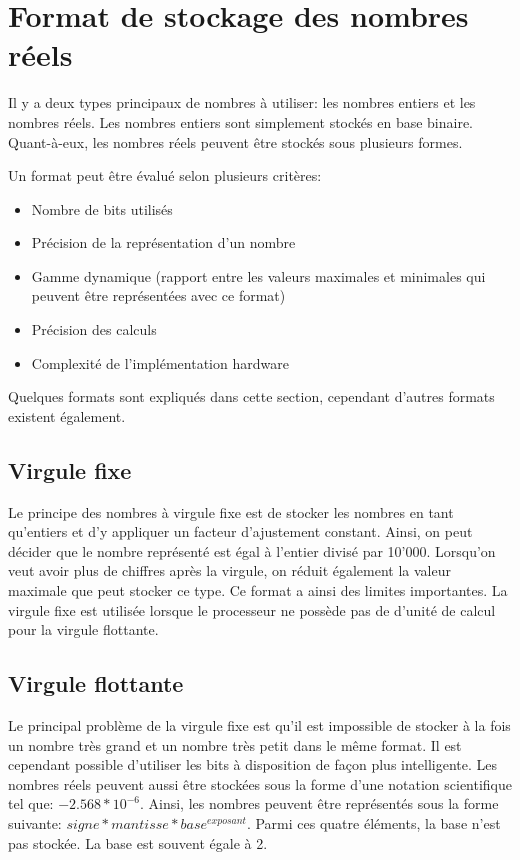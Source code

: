 \section{Format de stockage des nombres réels}

Il y a deux types principaux de nombres à utiliser: les nombres entiers et les nombres réels. Les nombres entiers sont simplement stockés en base binaire. Quant-à-eux, les nombres réels peuvent être stockés sous plusieurs formes.

Un format peut être évalué selon plusieurs critères:

\begin{itemize}
    \item Nombre de bits utilisés
    \item Précision de la représentation d'un nombre
    \item Gamme dynamique (rapport entre les valeurs maximales et minimales qui peuvent être représentées avec ce format)
    \item Précision des calculs
    \item Complexité de l'implémentation hardware
\end{itemize}

Quelques formats sont expliqués dans cette section, cependant d'autres formats existent également.

\subsection{Virgule fixe}

Le principe des nombres à virgule fixe est de stocker les nombres en tant qu'entiers et d'y appliquer un facteur d'ajustement constant. Ainsi, on peut décider que le nombre représenté est égal à l'entier divisé par 10'000. Lorsqu'on veut avoir plus de chiffres après la virgule, on réduit également la valeur maximale que peut stocker ce type. Ce format a ainsi des limites importantes. La virgule fixe est utilisée lorsque le processeur ne possède pas de d'unité de calcul pour la virgule flottante.

\subsection{Virgule flottante}

Le principal problème de la virgule fixe est qu'il est impossible de stocker à la fois un nombre très grand et un nombre très petit dans le même format. Il est cependant possible d'utiliser les bits à disposition de façon plus intelligente. Les nombres réels peuvent aussi être stockées sous la forme d'une notation scientifique tel que: $-2.568 * 10^{-6}$. Ainsi, les nombres peuvent être représentés sous la forme suivante: $signe * mantisse * base^{exposant}$. Parmi ces quatre éléments, la base n'est pas stockée. La base est souvent égale à 2.

